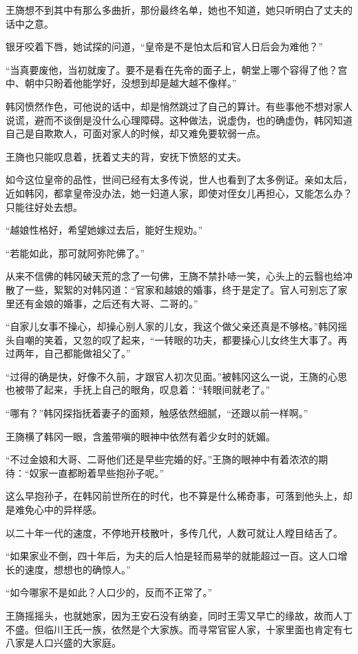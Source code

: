 王旖想不到其中有那么多曲折，那份最终名单，她也不知道，她只听明白了丈夫的话中之意。

银牙咬着下唇，她试探的问道，“皇帝是不是怕太后和官人日后会为难他？”

“当真要废他，当初就废了。要不是看在先帝的面子上，朝堂上哪个容得了他？宫中、朝中只盼着他能学好，没想到却是越大越不像样。”

韩冈愤然作色，可他说的话中，却是悄然跳过了自己的算计。有些事他不想对家人说谎，避而不谈倒是没什么心理障碍。这种做法，说虚伪，也的确虚伪，韩冈知道自己是自欺欺人，可面对家人的时候，却又难免要软弱一点。

王旖也只能叹息着，抚着丈夫的背，安抚下愤怒的丈夫。

如今这位皇帝的品性，世间已经有太多传说，世人也看到了太多例证。亲如太后，近如韩冈，都拿皇帝没办法，她一妇道人家，即使对侄女儿再担心，又能怎么办？只能往好处去想。

“越娘性格好，希望她嫁过去后，能好生规劝。”

“若能如此，那可就阿弥陀佛了。”

从来不信佛的韩冈破天荒的念了一句佛，王旖不禁扑哧一笑，心头上的云翳也给冲散了一些，絮絮的对韩冈道：“官家和越娘的婚事，终于是定了。官人可别忘了家里还有金娘的婚事，之后还有大哥、二哥的。”

“自家儿女事不操心，却操心别人家的儿女，我这个做父亲还真是不够格。”韩冈摇头自嘲的笑着，又忽的叹了起来，“一转眼的功夫，都要操心儿女终生大事了。再过两年，自己都能做祖父了。”

“过得的确是快，好像不久前，才跟官人初次见面。”被韩冈这么一说，王旖的心思也被带了起来，手抚上自己的眼角，叹息着：“转眼间就老了。”

“哪有？”韩冈探指抚着妻子的面颊，触感依然细腻，“还跟以前一样啊。”

王旖横了韩冈一眼，含羞带嗔的眼神中依然有着少女时的妩媚。

“不过金娘和大哥、二哥他们还是早些完婚的好。”王旖的眼神中有着浓浓的期待：“奴家一直都盼着早些抱孙子呢。”

这么早抱孙子，在韩冈前世所在的时代，也不算是什么稀奇事，可落到他头上，却是难免心中的异样感。

以二十年一代的速度，不停地开枝散叶，多传几代，人数可就让人瞠目结舌了。

“如果家业不倒，四十年后，为夫的后人怕是轻而易举的就能超过一百。这人口增长的速度，想想也的确惊人。”

“如今哪家不是如此？人口少的，反而不正常了。”

王旖摇摇头，也就她家，因为王安石没有纳妾，同时王雱又早亡的缘故，故而人丁不盛。但临川王氏一族，依然是个大家族。而寻常官宦人家，十家里面也肯定有七八家是人口兴盛的大家庭。

